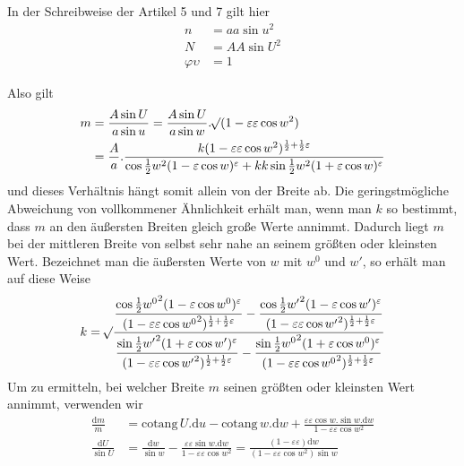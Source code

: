 In der Schreibweise der Artikel 5 und 7 gilt hier
\[
\begin{aligned}
n&=aa\sin u^2\\
N&=AA\sin U^2\\
\varphi\upsilon&=1
\end{aligned}
\]
\par\indent Also gilt
\[
\begin{aligned}
m&=\frac{A\sin U}{a\sin u}=\frac{A\sin U}{a\sin w}\mathord{.}\mathord{{}^{}\!\surd}(1-\varepsilon\varepsilon\cos w^2)\\
&=\frac{A}{a}\mathord{.}\frac{k(1-\varepsilon\varepsilon\cos w^2)^{\frac{1}{2}+\frac{1}{2}\varepsilon}}{\cos\frac{1}{2}w^2(1-\varepsilon\cos w)^{\varepsilon}+kk\sin\frac{1}{2}w^2(1+\varepsilon\cos w)^{\varepsilon}}
\end{aligned}
\]
\noindent und dieses Verhältnis hängt somit allein von der Breite ab. Die geringstmögliche Abweichung von vollkommener Ähnlichkeit erhält man, wenn man \(k\) so bestimmt, dass \(m\) an den äußersten Breiten gleich große Werte annimmt. Dadurch liegt \(m\) bei der mittleren Breite von selbst sehr nahe an seinem größten oder kleinsten Wert. Bezeichnet man die äußersten Werte von \(w\) mit \(w^0\) und \(w'\), so erhält man auf diese Weise
\[
k=\mathord{{}^{}\!\surd}\frac{\displaystyle\frac{\cos\frac{1}{2}{w^0}^{2}(1-\varepsilon\cos w^0)^{\varepsilon}}{(1-\varepsilon\varepsilon\cos {w^0}^{2})^{\frac{1}{2}+\frac{1}{2}\varepsilon}}-\frac{\cos\frac{1}{2}{w'}^{2}(1-\varepsilon\cos w')^{\varepsilon}}{(1-\varepsilon\varepsilon\cos {w'}^{2})^{\frac{1}{2}+\frac{1}{2}\varepsilon}}}{\displaystyle\frac{\sin\frac{1}{2}{w'}^{2}(1+\varepsilon\cos w')^{\varepsilon}}{(1-\varepsilon\varepsilon\cos {w'}^{2})^{\frac{1}{2}+\frac{1}{2}\varepsilon}}-\frac{\sin\frac{1}{2}{w^0}^{2}(1+\varepsilon\cos w^0)^{\varepsilon}}{(1-\varepsilon\varepsilon\cos {w^0}^{2})^{\frac{1}{2}+\frac{1}{2}\varepsilon}}}
\]
\noindent Um zu ermitteln, bei welcher Breite \(m\) seinen größten oder kleinsten Wert annimmt, verwenden wir
%
\[
\begin{aligned}
\frac{\mathrm{d}m}{m}&=\mathrm{cotang}\,U\mathord{.}\mathrm{d}u-\mathrm{cotang}\,w\mathord{.}\mathrm{d}w+\frac{\varepsilon\varepsilon\cos w\mathord{.}\sin w\mathord{.}\mathrm{d}w}{1-\varepsilon\varepsilon\cos w^2}\\
\frac{\mathrm{d}U}{\sin U}&=\frac{\mathrm{d}w}{\sin w}-\frac{\varepsilon\varepsilon\sin w\mathord{.}\mathrm{d}w}{1-\varepsilon\varepsilon\cos w^2}=\frac{(1-\varepsilon\varepsilon)\mathrm{d}w}{(1-\varepsilon\varepsilon\cos w^2)\sin w}
\end{aligned}
\]
